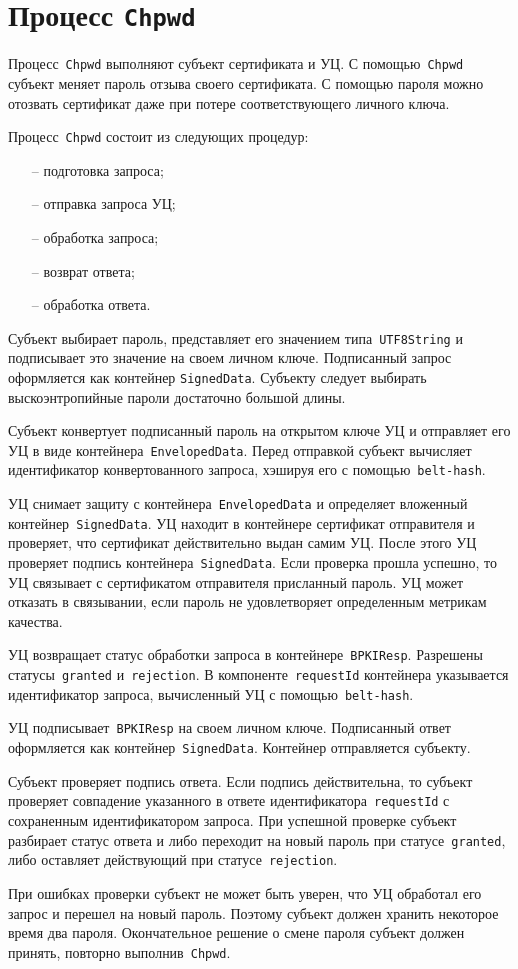 \section{Процесс \texttt{Chpwd}}\label{PROCESSES.Chpwd}

Процесс~\texttt{Chpwd} выполняют субъект сертификата и УЦ.
С помощью~\texttt{Chpwd} субъект меняет пароль отзыва своего 
сертификата. С помощью пароля можно отозвать сертификат даже при потере 
соответствующего личного ключа.

Процесс~\texttt{Chpwd} состоит из следующих процедур:
\begin{itemize}
\item[--]
подготовка запроса;
\item[--]
отправка запроса УЦ;
\item[--]
обработка запроса;
\item[--]
возврат ответа;
\item[--]
обработка ответа.
\end{itemize}

Субъект выбирает пароль, представляет его значением типа~\texttt{UTF8String}
и подписывает это значение на своем личном ключе.
Подписанный запрос оформляется как контейнер \texttt{SignedData}.
%
Субъекту следует выбирать выскоэнтропийные пароли достаточно большой 
длины.

Субъект конвертует подписанный пароль на открытом ключе УЦ
и отправляет его УЦ в виде контейнера~\texttt{EnvelopedData}.
Перед отправкой субъект вычисляет идентификатор конвертованного запроса,
хэшируя его с помощью~\texttt{belt-hash}.

УЦ снимает защиту с контейнера~\texttt{EnvelopedData} и определяет 
вложенный контейнер~\texttt{SignedData}. УЦ находит в контейнере
сертификат отправителя и проверяет, что сертификат действительно 
выдан самим УЦ. После этого УЦ проверяет подпись 
контейнера~\texttt{SignedData}. Если проверка прошла успешно, то УЦ  
связывает с сертификатом отправителя присланный пароль. УЦ может отказать 
в связывании, если пароль не удовлетворяет определенным метрикам качества.

УЦ возвращает статус обработки запроса в контейнере~\texttt{BPKIResp}.
Разрешены статусы~\texttt{granted} и~\texttt{rejection}.
В компоненте~\texttt{requestId} контейнера указывается идентификатор 
запроса, вычисленный УЦ с помощью~\texttt{belt-hash}.

УЦ подписывает~\texttt{BPKIResp} на своем личном ключе. Подписанный ответ 
оформляется как контейнер~\texttt{SignedData}. Контейнер отправляется 
субъекту.

Субъект проверяет подпись ответа. Если подпись действительна,
то субъект проверяет совпадение указанного в ответе 
идентификатора~\texttt{requestId} с сохраненным идентификатором запроса. 
При успешной проверке субъект разбирает статус ответа и либо переходит 
на новый пароль при статусе~\texttt{granted}, либо оставляет действующий
при статусе~\texttt{rejection}. 

При ошибках проверки субъект не может быть уверен, что УЦ обработал
его запрос и перешел на новый пароль. Поэтому субъект должен хранить  
некоторое время два пароля. Окончательное решение о смене пароля 
субъект должен принять, повторно выполнив~\texttt{Chpwd}.

